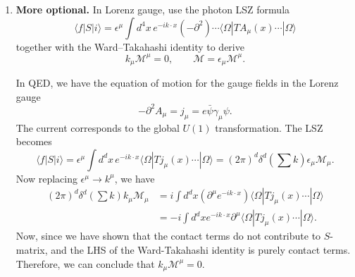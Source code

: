\begin{enumerate}[label=\alph*)]
    \item \textbf{More optional.} In Lorenz gauge, use the photon LSZ formula
    \begin{equation}
        \langle f|S|i\rangle
        =\epsilon^\mu\int d^4x\,e^{-ik\cdot x}
        (-\partial^2)\cdots
        \langle\Omega|T A_\mu(x)\cdots|\Omega\rangle
    \end{equation}
    together with the Ward--Takahashi identity to derive
    \begin{equation}
        k_\mu\mathcal M^\mu=0,
        \qquad
        \mathcal M=\epsilon_\mu\mathcal M^\mu.
    \end{equation}
    \begin{solution}
        In QED, we have the equation of motion for the gauge fields in the Lorenz gauge
        \begin{equation}
            -\partial^2A_\mu = j_\mu = e\bar \psi \gamma_\mu \psi.
        \end{equation}
        The current corresponds to the global $U(1)$ transformation. The LSZ becomes
        \begin{equation}
            \langle f|S|i\rangle=\epsilon^\mu\int d^dx\,e^{-ik\cdot x}
        \langle\Omega|T j_\mu(x)\cdots|\Omega\rangle = (2\pi)^d\delta^d\left(\sum k\right)\epsilon_\mu \mathcal{M}_\mu.
        \end{equation}
        Now replacing $\epsilon^\mu \to k^\mu$, we have
        \begin{equation}
        \begin{aligned}
            (2\pi)^d\delta^d\left(\sum k\right)k_\mu \mathcal{M}_\mu &= i\int d^dx  (\partial^\mu e^{-ik\cdot x}) \langle\Omega|T j_\mu(x)\cdots|\Omega\rangle\\
            &= - i\int d^dx   e^{-ik\cdot x}\partial^\mu\langle\Omega|T j_\mu(x)\cdots|\Omega\rangle.
        \end{aligned}
        \end{equation}
        Now, since we have shown that the contact terms do not contribute to $S$-matrix, and the LHS of the Ward-Takahashi identity is purely contact terms. Therefore, we can conclude that $k_\mu \mathcal{M}^\mu = 0$.
    \end{solution}
\end{enumerate}
